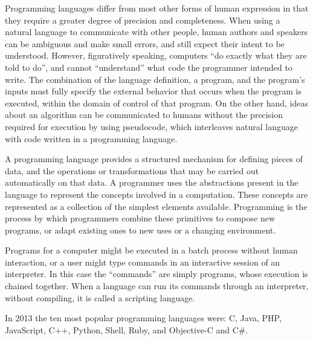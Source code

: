 Programming languages differ from most other forms of human expression in
that they require a greater degree of precision and completeness. When
using a natural language to communicate with other people, human authors
and speakers can be ambiguous and make small errors, and still expect their
intent to be under\-stood. However, figuratively speaking, computers ``do
exactly what they are told to do'', and cannot ``understand'' what code the
programmer intended to write. The combination of the language definition, a
program, and the program's inputs must fully specify the external behavior
that occurs when the program is executed, within the domain of control of
that program. On the other hand, ideas about an algorithm can be
communicated to humans without the precision required for execution by
using pseudocode, which interleaves natural language with code written in a
programming language.

A programming language provides a structured mechanism for defining pieces
of data, and the operations or transformations that may be carried out
automatically on that data. A programmer uses the abstractions present in
the language to represent the concepts involved in a computation. These
concepts are represented as a collect\-ion of the simplest elements available.
Programming is the process by which programmers combine these primitives to
compose new programs, or adapt existing ones to new uses or a changing
environment.

Programs for a computer might be executed in a batch process without human
interaction, or a user might type commands in an interactive session of an
interpreter. In this case the ``commands'' are simply programs, whose
execution is chained together. When a language can run its commands through
an interpreter, without compiling, it is called a scripting language.

In 2013 the ten most popular programming languages were: C, Java, PHP,
JavaScript, C++, Python, Shell, Ruby, and Objective-C and C\#.
